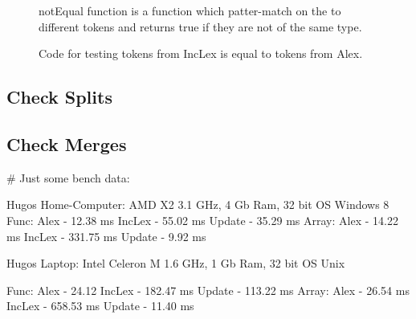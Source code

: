 \begin{figure}[h!]
  \centering
  
  notEqual function is a function which patter-match on the to different tokens and returns true if they are not of the same type.
  \caption{Code for testing tokens from IncLex is equal to tokens from Alex. 
  \label{fig:CheckEquility}}
\end{figure} 

\subsection{Check Splits}

\subsection{Check Merges} 


\# Just some bench data:

Hugos Home-Computer: AMD X2 3.1 GHz, 4 Gb Ram, 32 bit OS Windows 8
Func:
  Alex - 12.38 ms
  IncLex - 55.02 ms
  Update - 35.29 ms
Array:
  Alex - 14.22 ms
  IncLex - 331.75 ms
  Update - 9.92 ms

Hugos Laptop: Intel Celeron M 1.6 GHz, 1 Gb Ram, 32 bit OS Unix

Func:
  Alex - 24.12
  IncLex - 182.47 ms
  Update - 113.22 ms
Array:
  Alex - 26.54 ms
  IncLex - 658.53 ms
  Update - 11.40 ms


